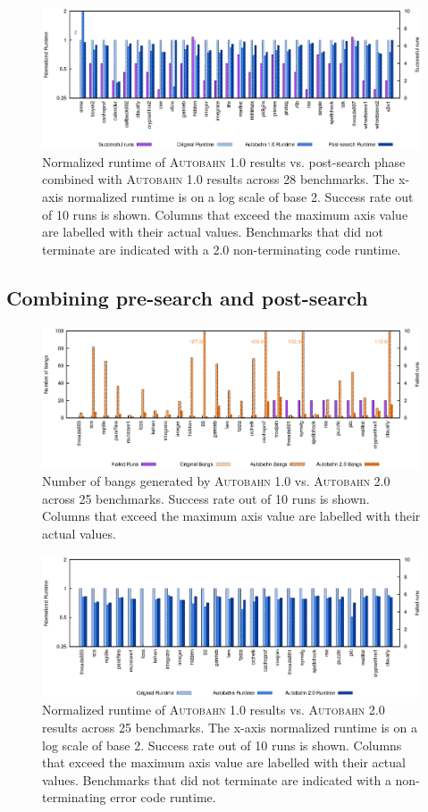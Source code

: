 \documentclass[format=sigplan, review=true]{acmart}
\newcommand{\Ao}[0]{\textsc{Autobahn 1.0}}
\newcommand{\At}[0]{\textsc{Autobahn 2.0}}
\newcommand{\preopt}[0]{pre-search}
\newcommand{\postopt}[0]{post-search}
\newcommand{\nonterm}[0]{non-terminating}
\begin{document}
\begin{figure}
\includegraphics[width=\textwidth]{ap-partial}
\caption{Normalized runtime of \Ao{} results vs. \postopt{} phase combined with \Ao{} results across 28 benchmarks. The x-axis normalized runtime is on a log scale of base 2. Success rate out of 10 runs is shown. Columns that exceed the maximum axis value are labelled with their actual values. Benchmarks that did not terminate are indicated with a 2.0 \nonterm{} code runtime.}
\end{figure}

\subsection{Combining \preopt{} and \postopt{}}


\begin{figure}
\includegraphics[width=\textwidth]{pap0-bangs}
\caption{Number of bangs generated by \Ao{} vs. \At{} across 25 benchmarks. Success rate out of 10 runs is shown. Columns that exceed the maximum axis value are labelled with their actual values.}
\end{figure}

\begin{figure}
\includegraphics[width=\textwidth]{pap0}
\caption{Normalized runtime of \Ao{} results vs. \At{} results across 25 benchmarks. The x-axis normalized runtime is on a log scale of base 2. Success rate out of 10 runs is shown. Columns that exceed the maximum axis value are labelled with their actual values. Benchmarks that did not terminate are indicated with a \nonterm{} error code runtime.}
\end{figure}
\end{document}
